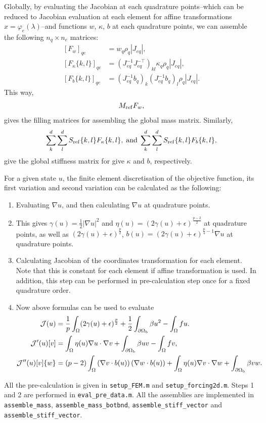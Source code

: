 \documentclass[a4paper,11pt]{scrartcl}
\newcommand{\eq}[1]{\begin{equation} #1 \end{equation}}
\newcommand{\eqs}[1]{\begin{align} #1 \end{align}}
\begin{document}
Globally, by evaluating the Jacobian at each quadrature points--which can be reduced to Jacobian evaluation at each element for affine transformations $x = \varphi_e(\lambda)$--and functions $w$, $\kappa$, $b$ at each quadrature points, we can assemble the following $n_q \times n_e$ matrices:
\eqs{
\left[F_w \right]_{qe} &=  w_q \rho_q \left|J_{eq}\right| ,\\
\left[F_\kappa\{k,l\}\right]_{qe} & = \left( J_{eq}^{-1} J_{eq}^{-\top} \right)_{kl} \kappa_q \rho_q \left|J_{eq}\right|, \\
\left[F_b\{k,l\}\right]_{qe} & = \left(J_{eq}^{-1} b_q\right)_k \left(J_{eq}^{-1} b_q\right)_l \rho_q \left|J_{eq}\right| .
}
This way,
\eq{M_{\rm ref} F_w,}
gives the filling matrices for assembling the global mass matrix. Similarly,
\eq{\sum_k^{d} \sum_l^{d} S_{\rm ref}\{k,l\}F_\kappa\{k,l\}, {\; \rm and \;} \sum_k^{d} \sum_l^{d}S_{\rm ref}\{k,l\}F_b\{k,l\},}
give the global stiffness matrix for give $\kappa$ and $b$, respectively.


For a given state $u$, the finite element discretisation of the objective function, its first variation and second variation can be calculated as the following:
\begin{enumerate}
\item Evaluating $\nabla u$, and then calculating $\nabla u$ at quadrature points.
\item This gives $\gamma(u) = \frac12 |\nabla u|^2$ and $\eta(u) = ( 2 \gamma(u) + \epsilon )^{\frac{p-2}{2}}$ at quadrature points, as well as $ (2\gamma(u) + \epsilon)^{\frac{p}{2}}$, $b(u) = \left( 2\gamma(u) + \epsilon \right)^{\frac{p}{4}-1} \nabla u$ at quadrature points.\\
\item Calculating Jacobian of the coordinates transformation for each element. Note that this is constant for each element if affine transformation is used. In addition, this step can be performed in pre-calculation step once for a fixed quadrature order.
\item Now above formulas can be used to evaluate
\eqs{ \mathcal{J}(u) & = \frac{1}{p}  \int_{\Omega}  (2\gamma(u) + \epsilon)^{\frac{p}{2}} + \frac12\int_{\partial\Omega_{\rm b}} \beta u^2  - \int_{\Omega} fu. \nonumber \\
%
\mathcal{J}^\prime(u)[v] & = \int_{\Omega} \eta(u) \nabla u \cdot \nabla v + \int_{\partial\Omega_{\rm b}} \beta uv  - \int_{\Omega} fv , \nonumber \\
%
\mathcal{J}^{\prime\prime}(u)[v]\{w\} & = (p-2) \int_{\Omega} \left(\nabla v \cdot b(u)\right) \left( \nabla w\cdot b(u) \right) + \int_{\Omega} \eta(u) \nabla v \cdot \nabla w  + \int_{\partial\Omega_{\rm b}} \beta vw  .\nonumber}
\end{enumerate}
All the pre-calculation is given in \verb|setup_FEM.m| and \verb|setup_forcing2d.m|. Steps 1 and 2 are performed in \verb|eval_pre_data.m|. All the assemblies are implemented in \verb|assemble_mass|, \verb|assemble_mass_botbnd|, \verb|assemble_stiff_vector| and \verb|assemble_stiff_vector|.
\end{document}
